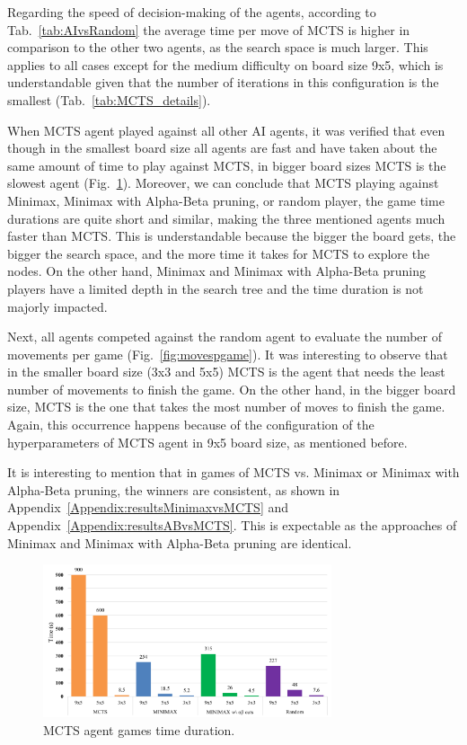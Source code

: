\documentclass[journal]{IEEEtran}
\begin{document}
Regarding the speed of decision-making of the agents, according to Tab.~\ref{tab:AIvsRandom} the average time per move of MCTS is higher in comparison to the other two agents, as the search space is much larger. This applies to all cases except for the medium difficulty on board size 9x5, which is understandable given that the number of iterations in this configuration is the smallest (Tab.~\ref{tab:MCTS_details}).

When MCTS agent played against all other AI agents, it was verified that even though in the smallest board size all agents are fast and have taken about the same amount of time to play against MCTS, in bigger board sizes MCTS is the slowest agent (Fig.~\ref{fig:mcts-time}). Moreover, we can conclude that MCTS playing against Minimax, Minimax with Alpha-Beta pruning, or random player, the game time durations are quite short and similar, making the three mentioned agents much faster than MCTS. This is understandable because the bigger the board gets, the bigger the search space, and the more time it takes for MCTS to explore the nodes. On the other hand, Minimax and Minimax with Alpha-Beta pruning players have a limited depth in the search tree and the time duration is not majorly impacted.

Next, all agents competed against the random agent to evaluate the number of movements per game (Fig.~\ref{fig:movespgame}). It was interesting to observe that in the smaller board size (3x3 and 5x5) MCTS is the agent that needs the least number of movements to finish the game. On the other hand, in the bigger board size, MCTS is the one that takes the most number of moves to finish the game. Again, this occurrence happens because of the configuration of the hyperparameters of MCTS agent in 9x5 board size, as mentioned before.

It is interesting to mention that in games of MCTS vs. Minimax or Minimax with Alpha-Beta pruning, the winners are consistent, as shown in Appendix~\ref{Appendix:resultsMinimaxvsMCTS} and Appendix~\ref{Appendix:resultsABvsMCTS}. This is expectable as the approaches of Minimax and Minimax with Alpha-Beta pruning are identical.

\begin{figure}[h!]
    \includegraphics[width = 8.5cm]{mcts-time}
    \caption{MCTS agent games time duration.}
    \label{fig:mcts-time}
\end{figure}
\end{document}
